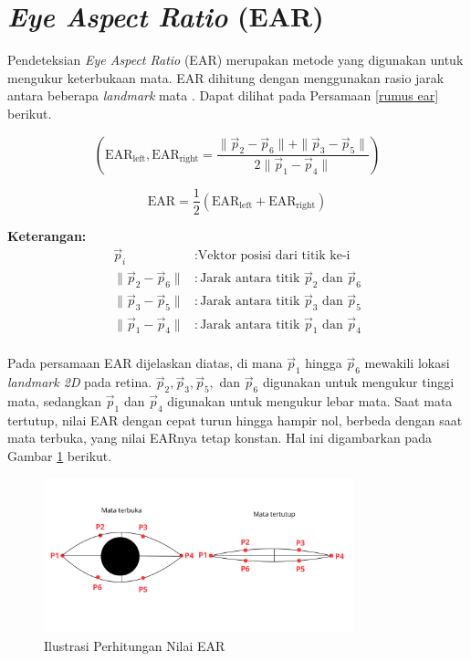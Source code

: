\section{\textit{Eye Aspect Ratio} (EAR)}

    Pendeteksian \textit{Eye Aspect Ratio }(EAR) merupakan metode yang digunakan untuk mengukur keterbukaan mata. EAR dihitung dengan menggunakan rasio jarak antara beberapa \textit{landmark} mata \cite{electronics11193183}. Dapat dilihat pada Persamaan \ref{rumus ear} berikut.

    
    \begin{equation}
    \label{rumus ear}
    (\text{EAR}_{\text{left}}, \text{EAR}_{\text{right}}   = \frac{{\| \vec{p}_2 - \vec{p}_6 \| + \| \vec{p}_3 - \vec{p}_5 \|}}{{2 \| \vec{p}_1 - \vec{p}_4 \|}})
    \end{equation}

    \begin{equation}
    \text{EAR} = \frac{1}{2}(\text{EAR}_{\text{left}} + \text{EAR}_{\text{right}})
    \end{equation}


    \textbf{Keterangan:}
    \begin{align*}
        \vec{p}_i & : \text{Vektor posisi dari titik ke-i} \\
        \|\vec{p}_2 - \vec{p}_6\| & : \text{Jarak antara titik } \vec{p}_2 \text{ dan } \vec{p}_6 \\
        \|\vec{p}_3 - \vec{p}_5\| & : \text{Jarak antara titik } \vec{p}_3 \text{ dan } \vec{p}_5 \\
        \|\vec{p}_1 - \vec{p}_4\| & : \text{Jarak antara titik } \vec{p}_1 \text{ dan } \vec{p}_4 \\
    \end{align*}
    

    Pada persamaan EAR dijelaskan diatas, di mana $\vec{p}_1$ hingga $\vec{p}_6$ mewakili lokasi
     \textit{landmark 2D} pada retina. $\vec{p}_2, \vec{p}_3, \vec{p}_5,$ dan $\vec{p}_6$ digunakan 
     untuk mengukur tinggi mata, sedangkan $\vec{p}_1$ dan $\vec{p}_4$ digunakan untuk mengukur lebar mata. 
     Saat mata tertutup, nilai EAR dengan cepat turun hingga hampir nol, berbeda dengan saat mata terbuka, 
     yang nilai EARnya tetap konstan. Hal ini digambarkan pada Gambar \ref{Ilustrasi Perhitungan Nilai EAR} berikut.

    \begin{figure}[H]
      \centering
      \includegraphics[width=0.8\textwidth]{figures/bab2/EAR.png}
      \caption{Ilustrasi Perhitungan Nilai EAR}
      \label{Ilustrasi Perhitungan Nilai EAR}
    \end{figure}
    
